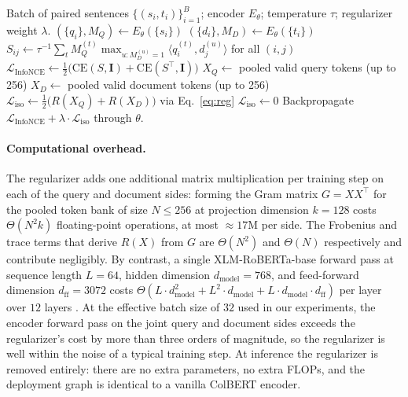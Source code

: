 \begin{algorithm}[t]
\caption{IsoColBERT training step}
\label{alg:training}
\begin{algorithmic}[1]
\REQUIRE Batch of paired sentences $\{(s_i, t_i)\}_{i=1}^B$; encoder $E_\theta$; temperature $\tau$; regularizer weight $\lambda$.
\STATE $(\{q_i\}, M_Q) \leftarrow E_\theta(\{s_i\})$ 
\STATE $(\{d_i\}, M_D) \leftarrow E_\theta(\{t_i\})$
\STATE $S_{ij} \leftarrow \tau^{-1} \sum_t M_Q^{(t)} \max_{u: M_D^{(u)} = 1} \langle q_i^{(t)}, d_j^{(u)} \rangle$ for all $(i, j)$ 
\STATE $\mathcal{L}_{\mathrm{InfoNCE}} \leftarrow \tfrac{1}{2}\bigl(\mathrm{CE}(S, \mathbf{I}) + \mathrm{CE}(S^\top, \mathbf{I})\bigr)$
  \STATE $X_Q \leftarrow$ pooled valid query tokens (up to 256)
  \STATE $X_D \leftarrow$ pooled valid document tokens (up to 256)
  \STATE $\mathcal{L}_{\mathrm{iso}} \leftarrow \tfrac{1}{2}\bigl(R(X_Q) + R(X_D)\bigr)$ via Eq.~\eqref{eq:reg}
\ELSE
  \STATE $\mathcal{L}_{\mathrm{iso}} \leftarrow 0$
\ENDIF
\STATE Backpropagate $\mathcal{L}_{\mathrm{InfoNCE}} + \lambda \cdot \mathcal{L}_{\mathrm{iso}}$ through $\theta$.
\end{algorithmic}
\end{algorithm}

\paragraph{Computational overhead.} The regularizer adds one additional matrix multiplication per training step on each of the query and document sides: forming the Gram matrix $G = XX^\top$ for the pooled token bank of size $N \le 256$ at projection dimension $k=128$ costs $\Theta(N^2 k)$ floating-point operations, at most $\approx 17$M per side. The Frobenius and trace terms that derive $R(X)$ from $G$ are $\Theta(N^2)$ and $\Theta(N)$ respectively and contribute negligibly. By contrast, a single XLM-RoBERTa-base forward pass at sequence length $L=64$, hidden dimension $d_{\text{model}}=768$, and feed-forward dimension $d_{\text{ff}}=3072$ costs $\Theta(L \cdot d_{\text{model}}^2 + L^2 \cdot d_{\text{model}} + L \cdot d_{\text{model}} \cdot d_{\text{ff}})$ per layer over $12$ layers \citep{conneau2020xlmr}. At the effective batch size of $32$ used in our experiments, the encoder forward pass on the joint query and document sides exceeds the regularizer's cost by more than three orders of magnitude, so the regularizer is well within the noise of a typical training step. At inference the regularizer is removed entirely: there are no extra parameters, no extra FLOPs, and the deployment graph is identical to a vanilla ColBERT encoder.

